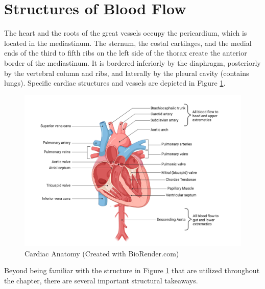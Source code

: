 \section{Structures of Blood Flow}

The heart and the roots of the great vessels occupy the pericardium, which is located in the mediastinum. The sternum, the costal cartilages, and the medial ends of the third to fifth ribs on the left side of the thorax create the anterior border of the mediastinum. It is bordered inferiorly by the diaphragm, posteriorly by the vertebral column and ribs, and laterally by the pleural cavity (contains lungs). Specific cardiac structures and vessels are depicted in Figure \ref{fig:Cardiac_Anatomy}.

\begin{figure}[!h]
    \centering
    \includegraphics[width=1\linewidth]{./figure/Cardiac_Anatomy.png}
    \caption{Cardiac Anatomy \footnotesize{(Created with BioRender.com)}}
    \label{fig:Cardiac_Anatomy}
\end{figure}

Beyond being familiar with the structure in Figure \ref{fig:Cardiac_Anatomy} that are utilized throughout the chapter, there are several important structural takeaways.

